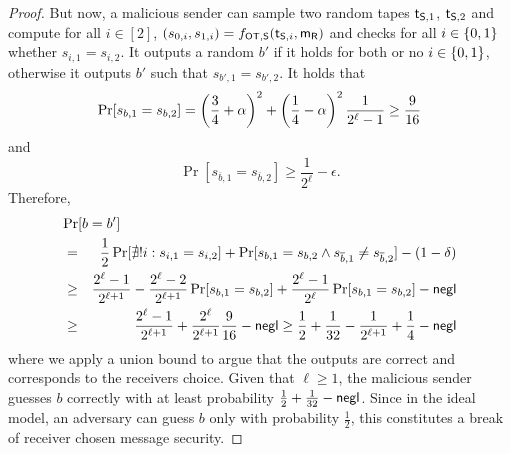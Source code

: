 \begin{proof}
But now, a malicious sender can sample two random tapes $\mathsf{t}_{\mathsf{S},1}$, $\mathsf{t}_{\mathsf{S},2}$
and compute for all $i\in[2]$, $(s_{0,i},s_{1,i})=f_{\mathsf{OT},\mathsf{S}}(\mathsf{t}_{\mathsf{S},i},\mathsf{m}_{\mathsf{R}})$ and checks for all $i\in\{0,1\}$ whether $s_{i,1}=s_{i,2}$. It outputs a random $b'$ if it holds for both or no $i\in\{0,1\}$, otherwise it outputs $b'$ such that $s_{b',1}=s_{b',2}$. It holds that
$$
\Pr[s_{b,1}=s_{b,2}]= \left(\frac{3}{4}+\alpha\right)^2+\left(\frac{1}{4}-\alpha\right)^2\frac{1}{2^\ell-1}\\
\geq \frac{9}{16}
$$
and
$$
\Pr[s_{\overline{b},1}=s_{\overline{b},2}]\geq \frac{1}{2^\ell}-\epsilon.
$$
Therefore,
\begin{eqnarray*}
\lefteqn{\Pr[b=b']}\\
&=&\frac{1}{2}\Pr[\nexists! i:s_{i,1}= s_{i,2}]+\Pr[s_{b,1}=s_{b,2}\wedge s_{\overline b,1}\neq s_{\overline b,2}]-(1-\delta)\\
&\geq& \frac{2^\ell-1}{2^{\ell+1}}-\frac{2^\ell-2}{2^{\ell+1}}\Pr[s_{b,1}=s_{b,2}]+\frac{2^\ell-1}{2^\ell}\Pr[s_{b,1}=s_{b,2}]
-\negl\\
&\geq & \frac{2^{\ell}-1}{2^{\ell+1}}+\frac{2^{\ell}}{2^{\ell+1}}\frac{9}{16}-\negl\geq
\frac{1}{2}+\frac{1}{32}-\frac{1}{2^{\ell+1}}+\frac{1}{4}-\negl
\end{eqnarray*}
where we apply a union bound to argue that the outputs are correct and corresponds to the receivers choice. Given that $\ell\geq 1$, the malicious sender guesses $b$ correctly with at least probability $\frac{1}{2}+\frac{1}{32}-\mathsf{negl}$. Since in the ideal model, an adversary can guess $b$ only with probability $\frac{1}{2}$, this constitutes a break of receiver chosen message security.


\end{proof}
